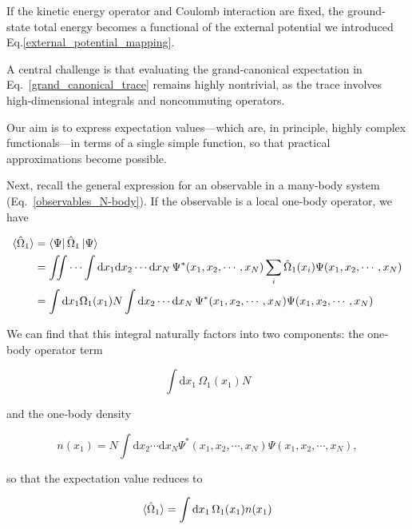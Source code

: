 If the kinetic energy operator and Coulomb interaction are fixed, the ground‐state total energy becomes a functional of the external potential we introduced Eq.\eqref{external_potential_mapping}.

A central challenge is that evaluating the grand‐canonical expectation in Eq.~\eqref{grand_canonical_trace} remains highly nontrivial, as the trace involves high‐dimensional integrals and noncommuting operators.

Our aim is to express expectation values—which are, in principle, highly complex functionals—in terms of a single simple function, so that practical approximations become possible.

Next, recall the general expression for an observable in a many‐body system (Eq.~\eqref{observables_N-body}). If the observable is a local one‐body operator, we have

\begin{equation}
\begin{aligned}
    \braket{\hat\Omega_1}
    &= \bra{\Psi}\hat\Omega_1\ket{\Psi} \\
    &= \iint\cdots\int \mathrm{d}x_1\mathrm{d}x_2\cdots\mathrm{d}x_N\,\Psi^*(x_1,x_2,\cdots,x_N)\sum_{i}\hat\Omega_1(x_i)\Psi(x_1,x_2,\cdots,x_N) \\
    &= \int\mathrm{d}x_1\Omega_1(x_1)N\int\mathrm{d}x_2\cdots\mathrm{d}x_N\,\Psi^*(x_1,x_2,\cdots,x_N)\Psi(x_1,x_2,\cdots,x_N)
\end{aligned}
\label{observables_one-body}
\end{equation}

We can find that this integral naturally factors into two components: the one‐body operator term

\begin{equation}
\int\mathrm{d}x_1\,\Omega_1(x_1)N
\label{one-body_operator}
\end{equation}

and the one‐body density

\begin{equation}
n(x_1)=N\int\mathrm{d}x_2\cdots\mathrm{d}x_N\Psi^*(x_1,x_2,\cdots,x_N)\Psi(x_1,x_2,\cdots,x_N),
\label{one-body_density}
\end{equation}

so that the expectation value reduces to

\begin{equation}
\braket{\hat\Omega_1}=\int\mathrm{d}x_1\,\Omega_1(x_1)n(x_1)
\label{observables_one-body_density}
\end{equation}

